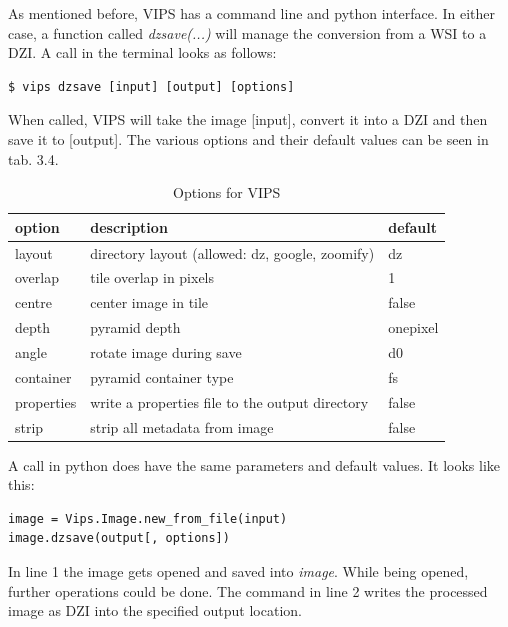 As mentioned before, VIPS has a command line and python interface. In either case, a function called \emph{dzsave(...)} will manage the conversion from a WSI to a DZI. A call in the terminal looks as follows:

\begin{lstlisting}
$ vips dzsave [input] [output] [options]
\end{lstlisting}

When called, VIPS will take the image [input], convert it into a DZI and then save it to [output]. The various options and their default values can be seen in tab. 3.4. 

\begin{table}[H]
	\begin{center}
		\begin{tabular}{| l | l | l |}
			\hline
			\textbf{option} & \textbf{description} & \textbf{default} \\ \hline
			layout & directory layout (allowed: dz, google, zoomify) & dz \\ \hline
			overlap & tile overlap in pixels & 1 \\ \hline
			centre & center image in tile & false \\ \hline
			depth & pyramid depth & onepixel \\ \hline
			angle & rotate image during save & d0 \\ \hline
			container & pyramid container type & fs \\ \hline
			properties & write a properties file to the output directory & false \\ \hline
			strip & strip all metadata from image & false \\ \hline
		\end{tabular}
		\caption{Options for VIPS}
	\end{center}
\end{table}

A call in python does have the same parameters and default values. It looks like this:

\begin{lstlisting}[frame=single]
image = Vips.Image.new_from_file(input)
image.dzsave(output[, options])
\end{lstlisting}

In line 1 the image gets opened and saved into \emph{image}. While being opened, further operations could be done. The command in line 2 writes the processed image as DZI into the specified output location.


